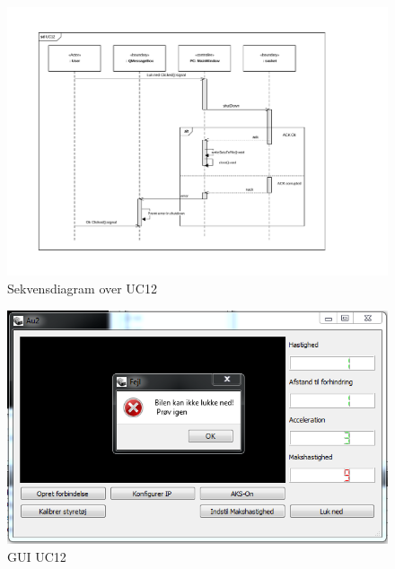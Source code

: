 \begin{figure}[H]
\centering
\includegraphics[width=\textwidth* 2/3,height=\textwidth* 4/10 ]{../fig/diagrammer/pc/sd_uc12.pdf}
\caption{Sekvensdiagram over UC12}
\label{fig:cd_uc12}
\end{figure}

\begin{figure}[H]
\centering
\includegraphics[width=\textwidth* 3/4,height=\textwidth* 9/20 ]{../fig/billeder/gui_uc12.png}
\caption{GUI UC12}
\label{fig:GUI_uc12}
\end{figure}


